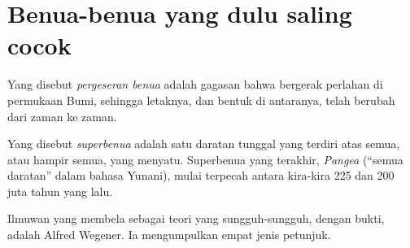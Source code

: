 \section{Benua-benua yang dulu saling cocok}

\begin{definition}\label{def:g7:plate-tectonics:continental-drift}
Yang disebut \emph{pergeseran benua} adalah gagasan
bahwa  bergerak perlahan di permukaan Bumi, sehingga letaknya,
dan bentuk  di antaranya, telah berubah dari zaman ke zaman.
\end{definition}

\begin{definition}[Superbenua]\label{def:g7:plate-tectonics:supercontinent}
Yang disebut \emph{superbenua} adalah satu daratan tunggal
yang terdiri atas semua, atau hampir semua,  yang menyatu. Superbenua
yang terakhir, \emph{Pangea} (``semua daratan'' dalam bahasa
Yunani), mulai terpecah antara kira-kira 225 dan 200 juta tahun yang lalu.
\end{definition}

Ilmuwan yang membela  sebagai teori yang sungguh-sungguh,
dengan bukti, adalah Alfred Wegener. Ia mengumpulkan empat jenis petunjuk.

